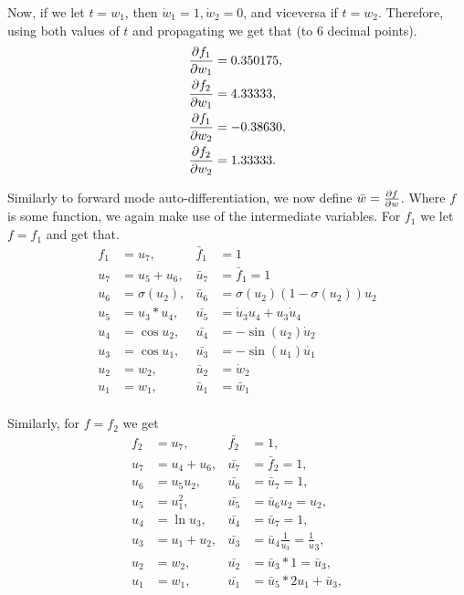 \documentclass[twoside]{article}
\begin{document}
Now, if we let $t = w_{1}$, then $\dot{w}_{1} = 1, \dot{w}_{2} = 0$, and viceversa if $t = w_{2}$.
Therefore, using both values of $t$ and propagating we get that (to 6 decimal points).
\begin{align*}
	\pdv{f_{1}}{w_{1}} & = 0.350175, \\
	\pdv{f_{2}}{w_{1}} & = 4.33333,  \\
	\pdv{f_{1}}{w_{2}} & = -0.38630, \\
	\pdv{f_{2}}{w_{2}} & = 1.33333.
\end{align*}

Similarly to forward mode auto-differentiation, we now define $\bar{w} = \pdv{f}{w}$.
Where $f$ is some function, we again make use of the intermediate variables. For $f_{1}$
we let $f = f_{1}$ and get that.
\begin{align*}
	f_{1} & = u_{7},         & \bar{f}_{1} & = 1                                     \\
	u_{7} & = u_{5} + u_{6}, & \bar{u}_{7} & = \bar{f}_{1} =  1                      \\
	u_{6} & = \sigma(u_{2}), & \bar{u}_{6} & = \sigma(u_{2})(1 - \sigma(u_{2}))u_{2} \\
	u_{5} & = u_{3}*u_{4},   & \bar{u_{5}} & = \dot{u}_{3}u_{4} + u_{3}\dot{u}_{4}   \\
	u_{4} & = \cos u_{2},    & \bar{u_{4}} & = -\sin(u_{2})\dot{u}_{2}               \\
	u_{3} & = \cos u_{1},    & \bar{u_{3}} & = -\sin(u_{1})\dot{u_{1}}               \\
	u_{2} & = w_{2},         & \bar{u}_{2} & = \dot{w}_{2}                           \\
	u_{1} & = w_{1},         & \bar{u}_{1} & = \bar{w}_{1}                           \\
\end{align*}

Similarly, for $f = f_{2}$ we get
\begin{align*}
	f_{2} & = u_{7},         & \bar{f_{2}} & = 1,\\
	u_{7} & = u_{4} + u_{6}, & \bar{u_{7}} & = \bar{f}_{2} = 1,\\
	u_{6} & = u_{5}u_{2},    & \bar{u_{6}} & = \bar{u}_{7} = 1,\\
	u_{5} & = u_{1}^{2},     & \bar{u_{5}} & =\bar{u}_{6}u_{2} = u_{2}, \\
	u_{4} & = \ln u_{3},     & \bar{u_{4}} & =\bar{u}_{7} = 1,\\
	u_{3} & = u_{1} + u_{2}, & \bar{u_{3}} & = \bar{u}_{4} \frac{1}{u_{3}} = \frac{1}{u}_{3},\\
	u_{2} & = w_{2},         & \bar{u_{2}} & = \bar{u}_{3} * 1 = \bar{u}_{3}, \\
	u_{1} & = w_{1},         & \bar{u_{1}} & = \bar{u}_{5}*2u_{1} + \bar{u}_{3},
\end{align*}
\end{document}
